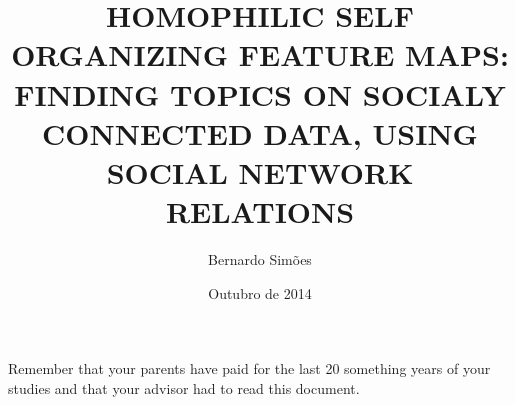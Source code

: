 

\title{HOMOPHILIC SELF ORGANIZING FEATURE MAPS: FINDING TOPICS ON SOCIALY CONNECTED DATA, USING SOCIAL NETWORK RELATIONS}

\author{Bernardo Simões}


\date{Outubro de 2014}



\maketitle
\clearpage

\thispagestyle{empty}
\cleardoublepage

\setcounter{page}{1} 

\baselineskip 18pt %
 
\begin{acknowledgments}
Remember that your parents have paid for the last 20 something years of your studies and that your advisor had to read this document.
\end{acknowledgments}
 
